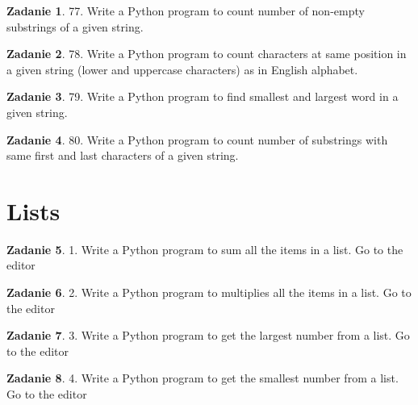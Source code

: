 \documentclass[11pt]{article}
\theoremstyle{definition}
\newtheorem{zadanie}{Zadanie}
\begin{document}
\begin{zadanie}


77. Write a Python program to count number of non-empty substrings of a given string. 

\end{zadanie}

\begin{zadanie}


78. Write a Python program to count characters at same position in a given string (lower and uppercase characters) as in English alphabet. 

\end{zadanie}

\begin{zadanie}


79. Write a Python program to find smallest and largest word in a given string. 

\end{zadanie}

\begin{zadanie}


80. Write a Python program to count number of substrings with same first and last characters of a given string. 

\end{zadanie}



\section{Lists}
\begin{zadanie}
1. Write a Python program to sum all the items in a list. Go to the editor
\end{zadanie}

\begin{zadanie}


2. Write a Python program to multiplies all the items in a list. Go to the editor


\end{zadanie}

\begin{zadanie}


3. Write a Python program to get the largest number from a list. Go to the editor


\end{zadanie}

\begin{zadanie}


4. Write a Python program to get the smallest number from a list. Go to the editor


\end{zadanie}
\end{document}
